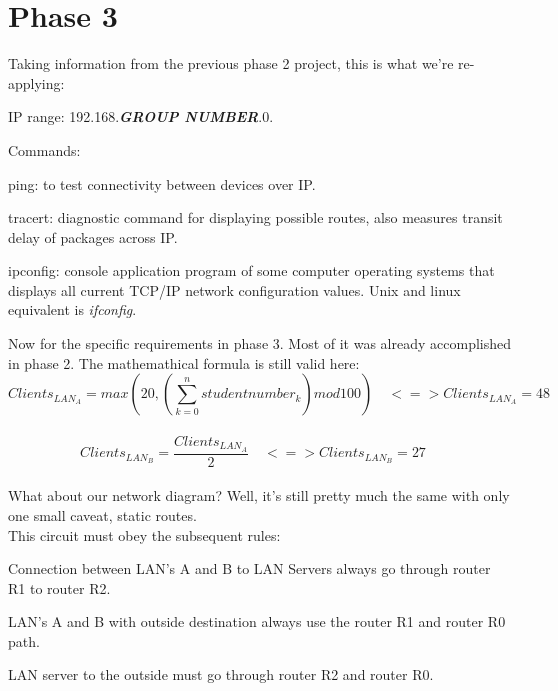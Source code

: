\documentclass[11pt,a4paper]{report}
\begin{document}
    \setcounter{page}{1}

\chapter{Phase 3}
    Taking information from the previous phase 2 project, this is what we're re-applying:
    \begin{compactitem}
        \item IP range: 192.168.\textbf{\textit{GROUP NUMBER}}.0.
        \item Commands:
        \begin{compactitem}
            \item ping: to test connectivity between devices over IP.
            \item tracert: diagnostic command for displaying possible routes, also measures transit delay of packages across IP.
            \item ipconfig: console application program of some computer operating systems that displays all current TCP/IP network configuration values. Unix and linux equivalent is \textit{ifconfig}.
        \end{compactitem}
    \end{compactitem}

    Now for the specific requirements in phase 3. Most of it was already accomplished in phase 2.
    The mathemathical formula is still valid here:\\
    \[
        Clients_{LAN_A} = max\left(20, \left(\sum_{k=0}^n studentnumber_k\right)mod 100\right)\quad <=> 
        Clients_{LAN_A} = 48\quad
    \] \\
    \[
        Clients_{LAN_B} = \frac{Clients_{LAN_A}}{2}\quad <=>
        Clients_{LAN_B} = 27\quad
    \]\\

    What about our network diagram? Well, it's still pretty much the same with only one small caveat, static routes.\\
    This circuit must obey the subsequent rules:
    \begin{compactitem}
        \item Connection between LAN's A and B to LAN Servers always go through router R1 to router R2.
        \item LAN's A and B with outside destination always use the router R1 and router R0 path.
        \item LAN server to the outside must go through router R2 and router R0.
    \end{compactitem}
\end{document}
